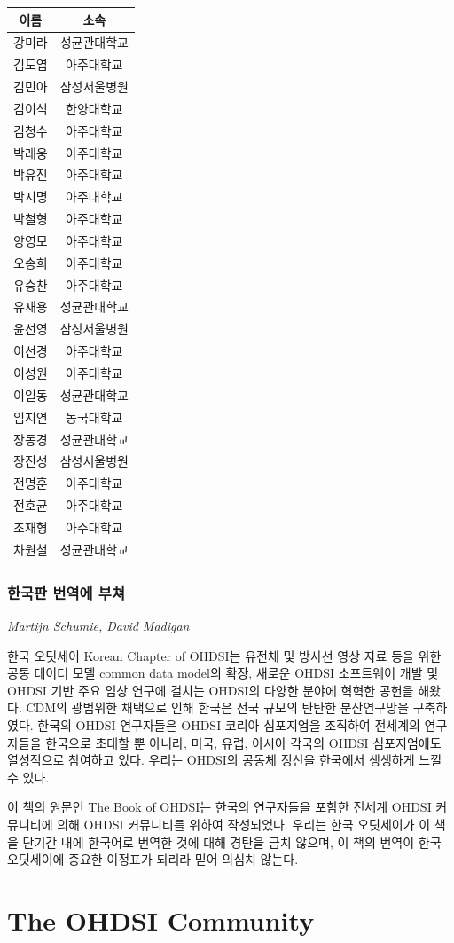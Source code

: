 \documentclass[11pt]{book}
\theoremstyle{definition}
\theoremstyle{definition}
\theoremstyle{definition}
\theoremstyle{remark}
\begin{document}
\begin{longtable}[]{@{}cc@{}}
\toprule
이름 & 소속\tabularnewline
\midrule
\endhead
강미라 & 성균관대학교\tabularnewline
김도엽 & 아주대학교\tabularnewline
김민아 & 삼성서울병원\tabularnewline
김이석 & 한양대학교\tabularnewline
김청수 & 아주대학교\tabularnewline
박래웅 & 아주대학교\tabularnewline
박유진 & 아주대학교\tabularnewline
박지명 & 아주대학교\tabularnewline
박철형 & 아주대학교\tabularnewline
양영모 & 아주대학교\tabularnewline
오송희 & 아주대학교\tabularnewline
유승찬 & 아주대학교\tabularnewline
유재용 & 성균관대학교\tabularnewline
윤선영 & 삼성서울병원\tabularnewline
이선경 & 아주대학교\tabularnewline
이성원 & 아주대학교\tabularnewline
이일동 & 성균관대학교\tabularnewline
임지연 & 동국대학교\tabularnewline
장동경 & 성균관대학교\tabularnewline
장진성 & 삼성서울병원\tabularnewline
전명훈 & 아주대학교\tabularnewline
전호균 & 아주대학교\tabularnewline
조재형 & 아주대학교\tabularnewline
차원철 & 성균관대학교\tabularnewline
\bottomrule
\end{longtable}

\section*{한국판 번역에 부쳐}\label{--}

\emph{Martijn Schumie, David Madigan}

한국 오딧세이 Korean Chapter of OHDSI는 유전체 및 방사선 영상 자료 등을
위한 공통 데이터 모델 common data model의 확장, 새로운 OHDSI 소프트웨어
개발 및 OHDSI 기반 주요 임상 연구에 걸치는 OHDSI의 다양한 분야에 혁혁한
공헌을 해왔다. CDM의 광범위한 채택으로 인해 한국은 전국 규모의 탄탄한
분산연구망을 구축하였다. 한국의 OHDSI 연구자들은 OHDSI 코리아 심포지엄을
조직하여 전세계의 연구자들을 한국으로 초대할 뿐 아니라, 미국, 유럽,
아시아 각국의 OHDSI 심포지엄에도 열성적으로 참여하고 있다. 우리는
OHDSI의 공동체 정신을 한국에서 생생하게 느낄 수 있다.

이 책의 원문인 The Book of OHDSI는 한국의 연구자들을 포함한 전세계 OHDSI
커뮤니티에 의해 OHDSI 커뮤니티를 위하여 작성되었다. 우리는 한국
오딧세이가 이 책을 단기간 내에 한국어로 번역한 것에 대해 경탄을 금치
않으며, 이 책의 번역이 한국 오딧세이에 중요한 이정표가 되리라 믿어
의심치 않는다.

\mainmatter

\part{The OHDSI Community}\label{part-the-ohdsi-community}
\end{document}
